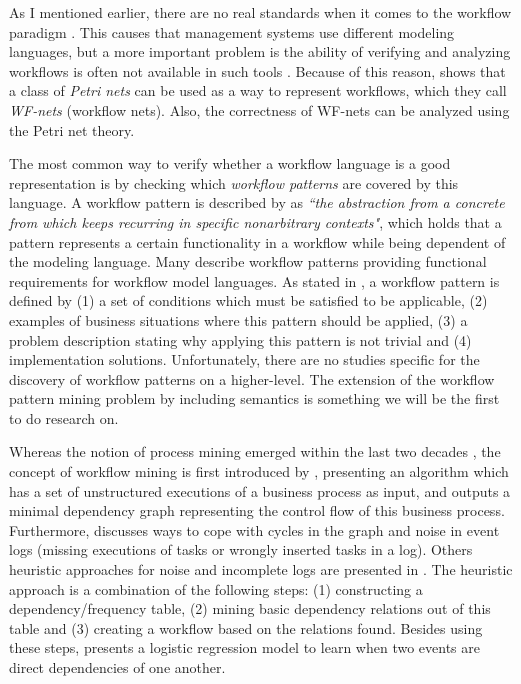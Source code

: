 \documentclass[a4paper,11pt]{article}
\begin{document}
As I mentioned earlier, there are no real standards when it comes to the workflow paradigm \cite{VanderAalst1997Verification}. This causes that management systems use different modeling languages, but a more important problem is the ability of verifying and analyzing workflows is often not available in such tools \cite{VanderAalst1997Verification}. Because of this reason, \cite{VanderAalst1997Verification} shows that a class of \textit{Petri nets} can be used as a way to represent workflows, which they call \textit{WF-nets} (workflow nets). Also, the correctness of WF-nets can be analyzed using the Petri net theory. 


The most common way to verify whether a workflow language is a good representation is by checking which \textit{workflow patterns} are covered by this language. A workflow pattern is described by \cite{Patterns1996} as \textit{``the abstraction from a concrete from which keeps recurring in specific nonarbitrary contexts"}, which holds that a pattern represents a certain functionality in a workflow while being dependent of the modeling language. Many \cite{VanderAalst2003Patterns,Dijkstra2003ControlPatterns,Russell2004DataPatterns,Russell2005ResourcePatterns,Russell2006ExceptionPatterns} describe workflow patterns providing functional requirements for workflow model languages. As stated in \cite{VanderAalst2003Patterns,Dijkstra2003ControlPatterns,Russell2004DataPatterns,Russell2005ResourcePatterns,Russell2006ExceptionPatterns}, a workflow pattern is defined by (1) a set of conditions which must be satisfied to be applicable, (2) examples of business situations where this pattern should be applied, (3) a problem description stating why applying this pattern is not trivial and (4) implementation solutions. Unfortunately, there are no studies specific for the discovery of workflow patterns on a higher-level. The extension of the workflow pattern mining problem by including semantics is something we will be the first to do research on.

Whereas the notion of process mining emerged within the last two decades \cite{VanderAalst2003Survey}, the concept of workflow mining is first introduced by \cite{WorkflowMining1998}, presenting an algorithm which has a set of unstructured executions of a business process as input, and outputs a minimal dependency graph representing the control flow of this business process. Furthermore, \cite{WorkflowMining1998} discusses ways to cope with cycles in the graph and noise in event logs (missing executions of tasks or wrongly inserted tasks in a log). Others heuristic approaches for noise and incomplete logs are presented in \cite{Maruster2002LogisticRegressionModel,Weijters2001DiscoveringWorkflowModels,Weijters2001Noise}. The heuristic approach \cite{Weijters2001DiscoveringWorkflowModels,Weijters2001Noise} is a combination of the following steps: (1) constructing a dependency/frequency table, (2) mining basic dependency relations out of this table and (3) creating a workflow based on the relations found. Besides using these steps, \cite{Maruster2002LogisticRegressionModel} presents a logistic regression model to learn when two events are direct dependencies of one another. 
\end{document}
